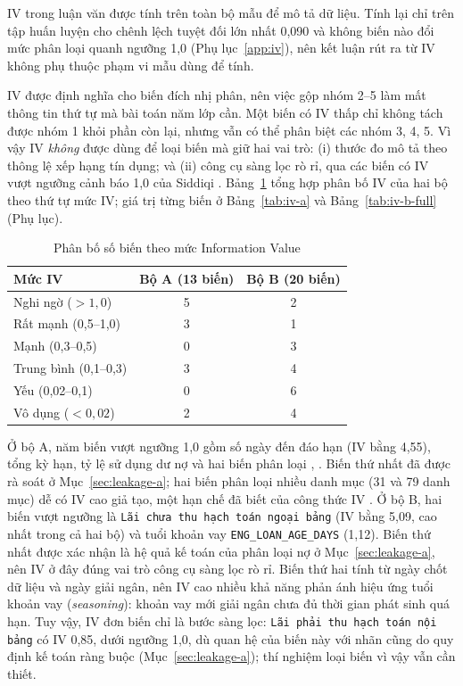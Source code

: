 IV trong luận văn được tính trên toàn bộ mẫu để mô tả dữ liệu. Tính lại chỉ trên tập huấn luyện cho chênh lệch tuyệt đối lớn nhất 0,090 và không biến nào đổi mức phân loại quanh ngưỡng 1,0 (Phụ lục~\ref{app:iv}), nên kết luận rút ra từ IV không phụ thuộc phạm vi mẫu dùng để tính.

IV được định nghĩa cho biến đích nhị phân, nên việc gộp nhóm 2--5 làm mất thông tin thứ tự mà bài toán năm lớp cần. Một biến có IV thấp chỉ không tách được nhóm 1 khỏi phần còn lại, nhưng vẫn có thể phân biệt các nhóm 3, 4, 5. Vì vậy IV \emph{không} được dùng để loại biến mà giữ hai vai trò: (i) thước đo mô tả theo thông lệ xếp hạng tín dụng; và (ii) công cụ sàng lọc rò rỉ, qua các biến có IV vượt ngưỡng cảnh báo 1,0 của Siddiqi \cite{siddiqi2006credit}. Bảng~\ref{tab:iv-b-dist} tổng hợp phân bố IV của hai bộ theo thứ tự mức IV; giá trị từng biến ở Bảng~\ref{tab:iv-a} và Bảng~\ref{tab:iv-b-full} (Phụ lục).

\begin{table}[H]
\centering
\caption{Phân bố số biến theo mức Information Value}
\label{tab:iv-b-dist}
\begin{tabular}{|l|c|c|}
\hline
Mức IV & Bộ A (13 biến) & Bộ B (20 biến)\\
\hline
Nghi ngờ ($>1,0$) & 5 & 2\\
Rất mạnh (0,5--1,0) & 3 & 1\\
Mạnh (0,3--0,5) & 0 & 3\\
Trung bình (0,1--0,3) & 3 & 4\\
Yếu (0,02--0,1) & 0 & 6\\
Vô dụng ($<0,02$) & 2 & 4\\
\hline
\end{tabular}
\end{table}

Ở bộ A, năm biến vượt ngưỡng 1,0 gồm số ngày đến đáo hạn (IV bằng 4,55), tổng kỳ hạn, tỷ lệ sử dụng dư nợ và hai biến phân loại , . Biến thứ nhất đã được rà soát ở Mục~\ref{sec:leakage-a}; hai biến phân loại nhiều danh mục (31 và 79 danh mục) dễ có IV cao giả tạo, một hạn chế đã biết của công thức IV \cite{siddiqi2006credit}. Ở bộ B, hai biến vượt ngưỡng là \texttt{Lãi chưa thu hạch toán ngoại bảng} (IV bằng 5,09, cao nhất trong cả hai bộ) và tuổi khoản vay \mbox{\texttt{ENG\_LOAN\_AGE\_DAYS}} (1,12). Biến thứ nhất được xác nhận là hệ quả kế toán của phân loại nợ ở Mục~\ref{sec:leakage-a}, nên IV ở đây đúng vai trò công cụ sàng lọc rò rỉ. Biến thứ hai tính từ ngày chốt dữ liệu và ngày giải ngân, nên IV cao nhiều khả năng phản ánh hiệu ứng tuổi khoản vay (\emph{seasoning}): khoản vay mới giải ngân chưa đủ thời gian phát sinh quá hạn. Tuy vậy, IV đơn biến chỉ là bước sàng lọc: \texttt{Lãi phải thu hạch toán nội bảng} có IV 0,85, dưới ngưỡng 1,0, dù quan hệ của biến này với nhãn cũng do quy định kế toán ràng buộc (Mục~\ref{sec:leakage-a}); thí nghiệm loại biến vì vậy vẫn cần thiết.

